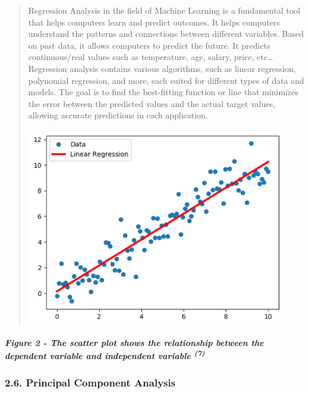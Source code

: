 \documentclass[
]{article}
\begin{document}
\begin{quote}
Regression Analysis in the field of Machine Learning is a fundamental
tool that helps computers learn and predict outcomes. It helps computers
understand the patterns and connections between different variables.
Based on past data, it allows computers to predict the future. It
predicts continuous/real values such as temperature, age, salary, price,
etc\ldots Regression analysis contains various algorithms, such as
linear regression, polynomial regression, and more, each suited for
different types of data and models. The goal is to find the best-fitting
function or line that minimizes the error between the predicted values
and the actual target values, allowing accurate predictions in each
application.

\includegraphics[width=4.50876in,height=3.38157in]{vertopal_f239f640fefe43bb8bc0698cafd57825/media/image1.png}
\end{quote}

\hypertarget{figure-2---the-scatter-plot-shows-the-relationship-between-the-dependent-variable-and-independent-variable-7}{%
\subparagraph{\texorpdfstring{\textbf{Figure 2} - The scatter plot shows
the relationship between the dependent variable and independent variable
\textsuperscript{(7)}}{Figure 2 - The scatter plot shows the relationship between the dependent variable and independent variable (7)}}\label{figure-2---the-scatter-plot-shows-the-relationship-between-the-dependent-variable-and-independent-variable-7}}

\hypertarget{principal-component-analysis}{%
\subsubsection{\texorpdfstring{\textbf{2.6. Principal Component
Analysis}}{2.6. Principal Component Analysis}}\label{principal-component-analysis}}
\end{document}
